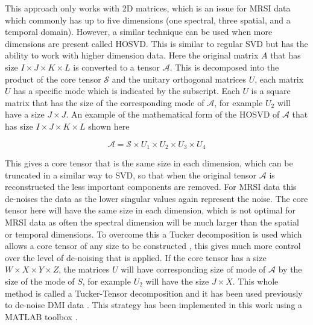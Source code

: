 This approach only works with 2D matrices, which is an issue for \ac{MRSI} data which commonly has up to five dimensions (one spectral, three spatial, and a temporal domain). However, a similar technique can be used when more dimensions are present called \ac{HOSVD}. This is similar to regular \ac{SVD} but has the ability to work with higher dimension data. Here the original matrix $A$ that has size $I \times J \times K \times L$ is converted to a tensor $\mathcal{A}$. This is decomposed into the product of the core tensor $\mathcal{S}$ and the unitary orthogonal matrices $U$, each matrix $U$ has a specific mode which is indicated by the subscript. Each $U$ is a square matrix that has the size of the corresponding mode of $\mathcal{A}$, for example $U_2$ will have a size $J \times J$. An example of the mathematical form of the \ac{HOSVD} of $\mathcal{A}$ that has size $I \times J \times K \times L$ shown here

\begin{equation}
    \mathcal{A} = \mathcal{S} \times U_1 \times U_2 \times U_3 \times U_4
    \label{eqn:theory:HOSVD}
\end{equation}

\noindent This gives a core tensor that is the same size in each dimension, which can be truncated in a similar way to \ac{SVD}, so that when the original tensor $\mathcal{A}$ is reconstructed the less important components are removed. For \ac{MRSI} data this de-noises the data as the lower singular values again represent the noise. The core tensor here will have the same size in each dimension, which is not optimal for \ac{MRSI} data as often the spectral dimension will be much larger than the spatial or temporal dimensions. To overcome this a Tucker decomposition is used which allows a core tensor of any size to be constructed \cite{Tucker1966SomeAnalysis}, this gives much more control over the level of de-noising that is applied. If the core tensor has a size $W \times X \times Y \times Z$, the matrices $U$ will have corresponding size of mode of $\mathcal{A}$ by the size of the mode of $S$, for example $U_2$ will have the size $J \times X$. This whole method is called a Tucker-Tensor decomposition and it has been used previously to de-noise \ac{DMI} data \cite{Kreis2020MeasuringMRI, Assmann2020InCholesterol}. This strategy has been implemented in this work using a MATLAB toolbox \cite{Bader2007EfficientTensors}.

